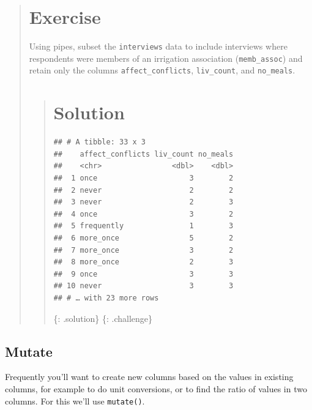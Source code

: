 \documentclass[]{book}
\newenvironment{Shaded}{\begin{snugshade}}{\end{snugshade}}
\newcommand{\KeywordTok}[1]{\textcolor[rgb]{0.13,0.29,0.53}{\textbf{#1}}}
\newcommand{\StringTok}[1]{\textcolor[rgb]{0.31,0.60,0.02}{#1}}
\newcommand{\OperatorTok}[1]{\textcolor[rgb]{0.81,0.36,0.00}{\textbf{#1}}}
\newcommand{\NormalTok}[1]{#1}
\begin{document}
\begin{quote}
\section{Exercise}\label{exercise-8}

Using pipes, subset the \texttt{interviews} data to include interviews
where respondents were members of an irrigation association
(\texttt{memb\_assoc}) and retain only the columns
\texttt{affect\_conflicts}, \texttt{liv\_count}, and \texttt{no\_meals}.

\begin{quote}
\section{Solution}\label{solution-9}

\begin{Shaded}
\end{Shaded}

\begin{verbatim}
## # A tibble: 33 x 3
##    affect_conflicts liv_count no_meals
##    <chr>                <dbl>    <dbl>
##  1 once                     3        2
##  2 never                    2        2
##  3 never                    2        3
##  4 once                     3        2
##  5 frequently               1        3
##  6 more_once                5        2
##  7 more_once                3        2
##  8 more_once                2        3
##  9 once                     3        3
## 10 never                    3        3
## # … with 23 more rows
\end{verbatim}

\{: .solution\} \{: .challenge\}
\end{quote}
\end{quote}

\subsection{Mutate}\label{mutate}

Frequently you'll want to create new columns based on the values in
existing columns, for example to do unit conversions, or to find the
ratio of values in two columns. For this we'll use \texttt{mutate()}.
\end{document}
